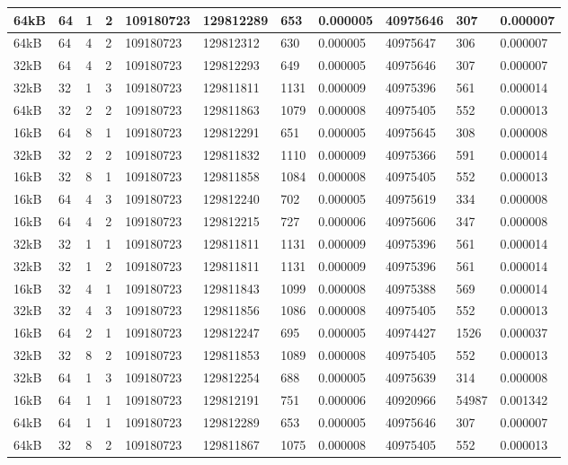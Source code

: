 \documentclass[conference]{IEEEtran}
\begin{document}
\begin{table}
\begin{tabular}{|m{.75cm} |m{.75cm} |m{.8cm} | m{.75cm} | l | l | l | l | l | l | l |}
64kB&	64&	1&	2&	109180723&	129812289&	653	&  0.000005&	40975646	&307	  &0.000007 \\ \hline
64kB&	64&	4&	2&	109180723&	129812312&	630	&  0.000005&	40975647	&306	  &0.000007 \\ \hline
32kB&	64&	4&	2&	109180723&	129812293&	649	&  0.000005&	40975646	&307	  &0.000007 \\ \hline
32kB&	32&	1&	3&	109180723&	129811811&	1131&	0.000009	&40975396	  &561	  &0.000014 \\ \hline
64kB&	32&	2&	2&	109180723&	129811863&	1079&	0.000008	&40975405	  &552	  &0.000013 \\ \hline
16kB&	64&	8&	1&	109180723&	129812291&	651	&  0.000005&	40975645	&308	  &0.000008 \\ \hline
32kB&	32&	2&	2&	109180723&	129811832&	1110&	0.000009	&40975366	  &591	  &0.000014 \\ \hline
16kB&	32&	8&	1&	109180723&	129811858&	1084&	0.000008	&40975405	  &552	  &0.000013 \\ \hline
16kB&	64&	4&	3&	109180723&	129812240&	702	&  0.000005&	40975619	&334	  &0.000008 \\ \hline
16kB&	64&	4&	2&	109180723&	129812215&	727	&  0.000006&	40975606	&347	  &0.000008 \\ \hline
32kB&	32&	1&	1&	109180723&	129811811&	1131&	0.000009	&40975396	  &561	  &0.000014 \\ \hline
32kB&	32&	1&	2&	109180723&	129811811&	1131&	0.000009	&40975396	  &561	  &0.000014 \\ \hline
16kB&	32&	4&	1&	109180723&	129811843&	1099&	0.000008	&40975388	  &569	  &0.000014 \\ \hline
32kB&	32&	4&	3&	109180723&	129811856&	1086&	0.000008	&40975405	  &552	  &0.000013 \\ \hline
16kB&	64&	2&	1&	109180723&	129812247&	695	&  0.000005&	40974427&	1526	&0.000037 \\ \hline
32kB&	32&	8&	2&	109180723&	129811853&	1089&	0.000008	&40975405	  &552	  &0.000013 \\ \hline
32kB&	64&	1&	3&	109180723&	129812254&	688	&  0.000005&	40975639	&314	  &0.000008 \\ \hline
16kB&	64&	1&	1&	109180723&	129812191&	751	&  0.000006&	40920966	&54987	&0.001342 \\ \hline
64kB&	64&	1&	1&	109180723&	129812289&	653	&  0.000005&	40975646	&307   &0.000007 \\ \hline
64kB&	32&	8&	2&	109180723&	129811867&	1075&	0.000008	&40975405	  &552   &0.000013 \\ \hline

\end{tabular}
\end{table}
\end{document}
